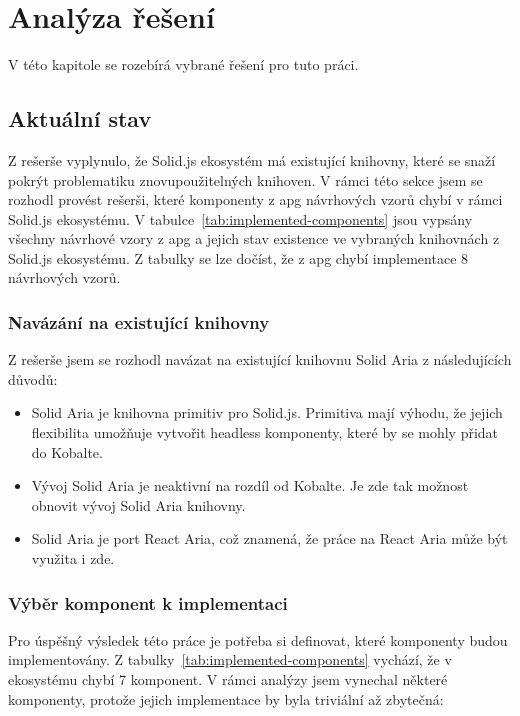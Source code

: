 \chapter{Analýza řešení}
\label{chap:analysis}

V této kapitole se rozebírá vybrané řešení pro tuto práci.

\section{Aktuální stav}

Z rešerše vyplynulo, že Solid.js ekosystém má existující knihovny, které se snaží pokrýt problematiku znovupoužitelných knihoven.
V rámci této sekce jsem se rozhodl provést rešerši, které komponenty z \gls{apg} návrhových vzorů chybí v rámci Solid.js ekosystému.
V tabulce~\ref{tab:implemented-components} jsou vypsány všechny návrhové vzory z \gls{apg} a jejich stav existence ve vybraných knihovnách z Solid.js ekosystému.
Z tabulky se lze dočíst, že z \gls{apg} chybí implementace 8 návrhových vzorů.

\subsection{Navázání na existující knihovny}

Z rešerše jsem se rozhodl navázat na existující knihovnu Solid Aria z následujících důvodů:

\begin{itemize}
      \item Solid Aria je knihovna primitiv pro Solid.js. Primitiva mají výhodu, že jejich flexibilita umožňuje vytvořit headless komponenty, které by se mohly přidat do Kobalte.
      \item Vývoj Solid Aria je neaktivní na rozdíl od Kobalte. Je zde tak možnost obnovit vývoj Solid Aria knihovny.
      \item Solid Aria je port React Aria, což znamená, že práce na React Aria může být využita i zde.
\end{itemize}

\subsection{Výběr komponent k implementaci}

Pro úspěšný výsledek této práce je potřeba si definovat, které komponenty budou implementovány.
Z tabulky~\ref{tab:implemented-components} vychází, že v ekosystému chybí 7 komponent.
V rámci analýzy jsem vynechal některé komponenty, protože jejich implementace by byla triviální až zbytečná:

